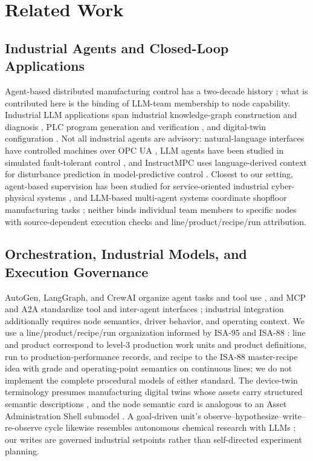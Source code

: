 \section{Related Work}
\subsection{Industrial Agents and Closed-Loop Applications}
Agent-based distributed manufacturing control has a two-decade history
\cite{leitao2009agentbased}; what is contributed here is the binding of LLM-team
membership to node capability. Industrial LLM applications span
industrial knowledge-graph construction \cite{zhang2026comaikg} and diagnosis
\cite{liu2024kgdiag}, PLC program generation and verification
\cite{liu2026agents4plc,fakih2024llm4plc}, and digital-twin configuration
\cite{xia2024llmsim}. Not all industrial agents are advisory: natural-language interfaces have controlled machines over OPC UA \cite{hofmann2025nlc}, LLM
agents have been studied in simulated fault-tolerant control \cite{vyas2026ftc},
and InstructMPC uses language-derived context for disturbance prediction in
model-predictive control \cite{wu2025instructmpc}. Closest to our setting,
agent-based supervision has been studied for service-oriented industrial
cyber-physical systems \cite{biskupovic2025supervision}, and LLM-based multi-agent
systems coordinate shopfloor manufacturing tasks \cite{zhao2026shopfloor}; neither
binds individual team members to specific nodes with source-dependent execution
checks and line/product/recipe/run attribution.

\subsection{Orchestration, Industrial Models, and Execution Governance}
AutoGen, LangGraph, and CrewAI organize agent tasks and tool use
\cite{wu2023autogen,langgraph2024,crewai2024}, and MCP and A2A standardize tool and
inter-agent interfaces \cite{mcp2024,a2a2025}; industrial integration additionally
requires node semantics, driver behavior, and operating context. We use a
line/product/recipe/run organization informed by ISA-95 and ISA-88
\cite{isa95,isa88}: line and product correspond to level-3 production work units and
product definitions, run to production-performance records, and recipe to the ISA-88
master-recipe idea with grade and operating-point semantics on continuous lines;
we do not implement the complete procedural
models of either standard. The device-twin terminology presumes manufacturing
digital twins whose assets carry structured semantic descriptions
\cite{nee2019digital}, and the node semantic card is analogous to an Asset
Administration Shell submodel \cite{iec63278}. A goal-driven unit's
observe--hypothesize--write--re-observe cycle likewise resembles autonomous chemical
research with LLMs \cite{boiko2023autonomous}; our writes are governed industrial
setpoints rather than self-directed experiment planning.

